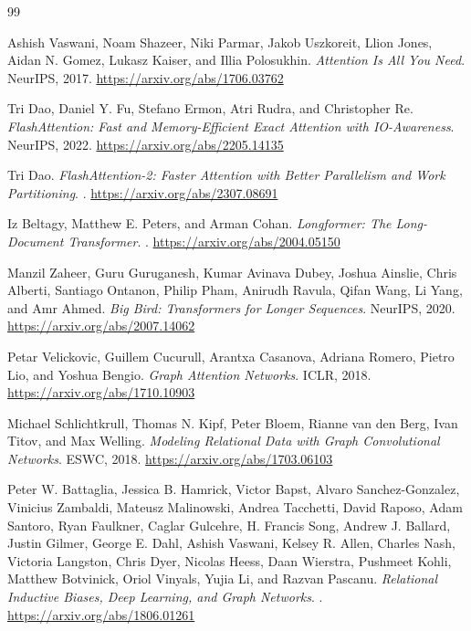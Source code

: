 \documentclass[11pt]{article}
\begin{document}
\begin{thebibliography}{99}

Ashish Vaswani, Noam Shazeer, Niki Parmar, Jakob Uszkoreit, Llion Jones,
Aidan N. Gomez, Lukasz Kaiser, and Illia Polosukhin.
\newblock \emph{Attention Is All You Need}.
\newblock NeurIPS, 2017.
\newblock \url{https://arxiv.org/abs/1706.03762}

Tri Dao, Daniel Y. Fu, Stefano Ermon, Atri Rudra, and Christopher Re.
\newblock \emph{FlashAttention: Fast and Memory-Efficient Exact Attention with IO-Awareness}.
\newblock NeurIPS, 2022.
\newblock \url{https://arxiv.org/abs/2205.14135}

Tri Dao.
\newblock \emph{FlashAttention-2: Faster Attention with Better Parallelism and Work Partitioning}.
.
\newblock \url{https://arxiv.org/abs/2307.08691}

Iz Beltagy, Matthew E. Peters, and Arman Cohan.
\newblock \emph{Longformer: The Long-Document Transformer}.
.
\newblock \url{https://arxiv.org/abs/2004.05150}

Manzil Zaheer, Guru Guruganesh, Kumar Avinava Dubey, Joshua Ainslie,
Chris Alberti, Santiago Ontanon, Philip Pham, Anirudh Ravula,
Qifan Wang, Li Yang, and Amr Ahmed.
\newblock \emph{Big Bird: Transformers for Longer Sequences}.
\newblock NeurIPS, 2020.
\newblock \url{https://arxiv.org/abs/2007.14062}

Petar Velickovic, Guillem Cucurull, Arantxa Casanova, Adriana Romero,
Pietro Lio, and Yoshua Bengio.
\newblock \emph{Graph Attention Networks}.
\newblock ICLR, 2018.
\newblock \url{https://arxiv.org/abs/1710.10903}

Michael Schlichtkrull, Thomas N. Kipf, Peter Bloem, Rianne van den Berg,
Ivan Titov, and Max Welling.
\newblock \emph{Modeling Relational Data with Graph Convolutional Networks}.
\newblock ESWC, 2018.
\newblock \url{https://arxiv.org/abs/1703.06103}

Peter W. Battaglia, Jessica B. Hamrick, Victor Bapst, Alvaro Sanchez-Gonzalez,
Vinicius Zambaldi, Mateusz Malinowski, Andrea Tacchetti, David Raposo,
Adam Santoro, Ryan Faulkner, Caglar Gulcehre, H. Francis Song,
Andrew J. Ballard, Justin Gilmer, George E. Dahl, Ashish Vaswani,
Kelsey R. Allen, Charles Nash, Victoria Langston, Chris Dyer,
Nicolas Heess, Daan Wierstra, Pushmeet Kohli, Matthew Botvinick,
Oriol Vinyals, Yujia Li, and Razvan Pascanu.
\newblock \emph{Relational Inductive Biases, Deep Learning, and Graph Networks}.
.
\newblock \url{https://arxiv.org/abs/1806.01261}


\end{thebibliography}
\end{document}
